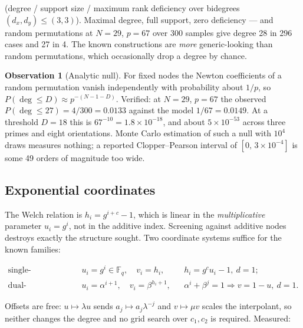 \documentclass[11pt,a4paper]{article}
\theoremstyle{definition}
\newtheorem{observation}[theorem]{Observation}
\newcommand{\F}{\mathbb{F}}
\begin{document}
\noindent(degree / support size / maximum rank deficiency over bidegrees
$(d_x,d_y)\le(3,3)$). Maximal degree, full support, zero deficiency --- and
random permutations at $N=29$, $p=67$ over 300 samples give degree 28 in 296
cases and 27 in 4. The known constructions are \emph{more} generic-looking than
random permutations, which occasionally drop a degree by chance.

\begin{observation}[Analytic null]
\label{obs:analyticnull}
For fixed nodes the Newton coefficients of a random permutation vanish
independently with probability about $1/p$, so $P(\deg\le D)\approx
p^{-(N-1-D)}$. Verified: at $N=29$, $p=67$ the observed $P(\deg\le27)=4/300=0.0133$
against the model $1/67=0.0149$. At a threshold $D=18$ this is
$67^{-10}=1.8\times10^{-18}$, and about $5\times10^{-53}$ across three primes and
eight orientations. Monte Carlo estimation of such a null with $10^4$ draws
measures nothing; a reported Clopper--Pearson interval of $[0,\,3\times10^{-4}]$
is some 49 orders of magnitude too wide.
\end{observation}

\subsection{Exponential coordinates}

The Welch relation is $h_i = g^{i+c}-1$, which is linear in the
\emph{multiplicative} parameter $u_i=g^i$, not in the additive index. Screening
against additive nodes destroys exactly the structure sought. Two coordinate
systems suffice for the known families:

\begin{align*}
\text{single-exponential (Welch):}&\quad u_i=g^{i}\in\F_q,\quad v_i=h_i,
  &&h_i=g^{c}u_i-1,\ d=1;\\
\text{dual-exponential (Golomb):}&\quad u_i=\alpha^{i+1},\quad v_i=\beta^{h_i+1},
  &&\alpha^i+\beta^j=1 \Rightarrow v=1-u,\ d=1.
\end{align*}

Offsets are free: $u\mapsto\lambda u$ sends $a_j\mapsto a_j\lambda^{-j}$ and
$v\mapsto\mu v$ scales the interpolant, so neither changes the degree and no grid
search over $c_1,c_2$ is required. Measured:
\end{document}

